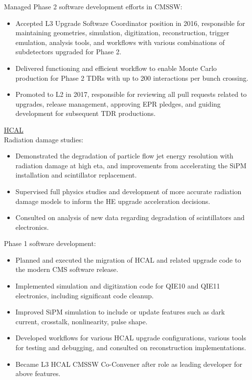 Managed Phase 2 software development efforts in CMSSW:
\begin{itemize}[leftmargin=12pt]
\item Accepted L3 Upgrade Software Coordinator position in 2016, responsible for maintaining geometries, simulation, digitization, reconstruction, trigger emulation, analysis tools, and workflows with various combinations of subdetectors upgraded for Phase 2.
\item Delivered functioning and efficient workflow to enable Monte Carlo production for Phase 2 TDRs with up to 200 interactions per bunch crossing.
\item Promoted to L2 in 2017, responsible for reviewing all pull requests related to upgrades, release management, approving EPR pledges, and guiding development for subsequent TDR productions.
\end{itemize}
\underline{HCAL}\\
Radiation damage studies:
\begin{itemize}[leftmargin=12pt]
\item Demonstrated the degradation of particle flow jet energy resolution with radiation damage at high eta, and improvements from accelerating the SiPM installation and scintillator replacement.
\item Supervised full physics studies and development of more accurate radiation damage models to inform the HE upgrade acceleration decisions.
\item Consulted on analysis of new data regarding degradation of scintillators and electronics.
\end{itemize}
Phase 1 software development:
\begin{itemize}[leftmargin=12pt]
\item Planned and executed the migration of HCAL and related upgrade code to the modern CMS software release.
\item Implemented simulation and digitization code for QIE10 and QIE11 electronics, including significant code cleanup.
\item Improved SiPM simulation to include or update features such as dark current, crosstalk, nonlinearity, pulse shape.
\item Developed workflows for various HCAL upgrade configurations, various tools for testing and debugging, and consulted on reconstruction implementations.
\item Became L3 HCAL CMSSW Co-Convener after role as leading developer for above features.
\end{itemize}